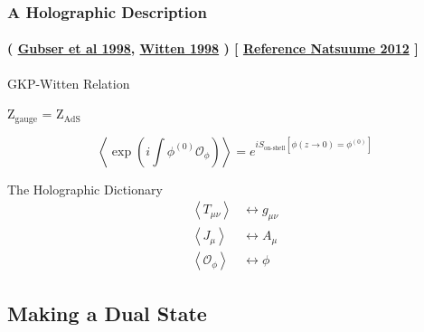 \documentclass[xcolor=dvipsnames]{beamer}
\begin{document}
\begin{frame}
  \frametitle{A Holographic Description }
  \framesubtitle{
    (
    \href{https://inspirehep.net/literature/467202}{Gubser et al 1998},
    \href{https://inspirehep.net/literature/467400}{Witten 1998}
  ) [ \href{https://inspirehep.net/literature/1316320}{Reference Natsuume 2012} ]}
  \begin{block}{GKP-Witten Relation}
    \begin{center}Z$_\text{gauge}$ = Z$_\text{AdS}$\end{center}
    $$\left\langle \exp\left(i\int\phi^{(0)} \mathcal O_\phi\right) \right\rangle =  e^{i S_\text{on-shell}[\phi(z\rightarrow0) = \phi^{(0)}]}$$
  \end{block}

  \begin{block}{The Holographic Dictionary}
    \begin{align*}
      \left\langle T_{\mu\nu}\right\rangle &\longleftrightarrow g_{\mu\nu}\\
      \left\langle J_{\mu}\right\rangle &\longleftrightarrow A_{\mu}\\
      \left\langle\mathcal O_\phi\right\rangle &\longleftrightarrow \phi
    \end{align*}
  \end{block}


\end{frame}

\subsection{Making a Dual State}
\end{document}
